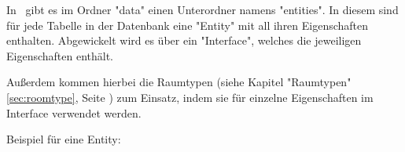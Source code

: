 
In \ZELIA\ gibt es im Ordner "data" einen Unterordner namens "entities". In diesem sind für jede Tabelle in der Datenbank eine "Entity" mit all ihren Eigenschaften enthalten. Abgewickelt wird es über ein "Interface", welches die jeweiligen Eigenschaften enthält.

Außerdem kommen hierbei die Raumtypen (siehe Kapitel "Raumtypen" \ref{sec:roomtype}, Seite \pageref{sec:roomtype}) zum Einsatz, indem sie für einzelne Eigenschaften im Interface verwendet werden.

Beispiel für eine Entity:

